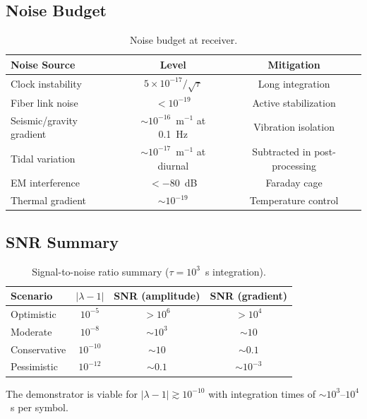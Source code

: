 \documentclass[11pt,onecolumn]{article}
\begin{document}
\subsection{Noise Budget}

\begin{table}[H]
\centering
\caption{Noise budget at receiver.}
\label{tab:noise}
\begin{tabular}{lcc}
\toprule
Noise Source & Level & Mitigation \\
\midrule
Clock instability & $5 \times 10^{-17}/\sqrt{\tau}$ & Long integration \\
Fiber link noise & $< 10^{-19}$ & Active stabilization \\
Seismic/gravity gradient & $\sim 10^{-16}$~m$^{-1}$ at 0.1~Hz & Vibration isolation \\
Tidal variation & $\sim 10^{-17}$~m$^{-1}$ at diurnal & Subtracted in post-processing \\
EM interference & $< -80$~dB & Faraday cage \\
Thermal gradient & $\sim 10^{-19}$ & Temperature control \\
\bottomrule
\end{tabular}
\end{table}

\subsection{SNR Summary}

\begin{table}[H]
\centering
\caption{Signal-to-noise ratio summary ($\tau = 10^3$~s integration).}
\label{tab:snr}
\begin{tabular}{lccc}
\toprule
Scenario & $|\lambda-1|$ & SNR (amplitude) & SNR (gradient) \\
\midrule
Optimistic & $10^{-5}$ & $> 10^6$ & $> 10^4$ \\
Moderate & $10^{-8}$ & $\sim 10^3$ & $\sim 10$ \\
Conservative & $10^{-10}$ & $\sim 10$ & $\sim 0.1$ \\
Pessimistic & $10^{-12}$ & $\sim 0.1$ & $\sim 10^{-3}$ \\
\bottomrule
\end{tabular}
\end{table}

The demonstrator is viable for $|\lambda - 1| \gtrsim 10^{-10}$
with integration times of $\sim 10^3$--$10^4$~s per symbol.

\end{document}
